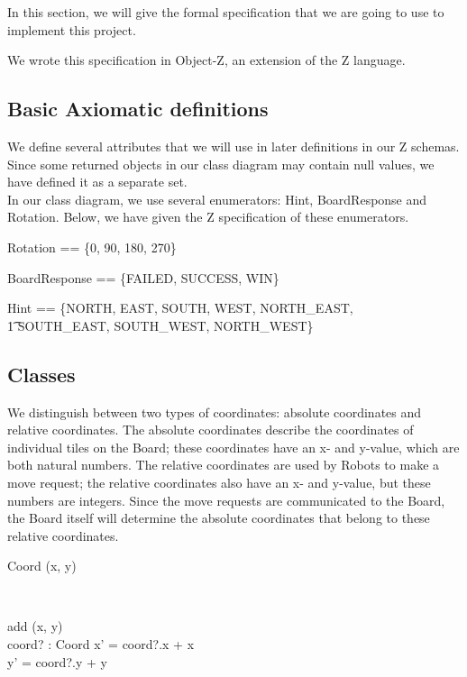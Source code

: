 In this section, we will give the formal specification that we are going to use to implement this project.

We wrote this specification in Object-Z, an extension of the Z language.

\subsection{Basic Axiomatic definitions}
We define several attributes that we will use in later definitions in our Z schemas. Since some returned objects in our class diagram may contain null values, we have defined it as a separate set. \\
In our class diagram, we use several enumerators: Hint, BoardResponse and Rotation. Below, we have given the Z specification of these enumerators.

\begin{axdef}
Rotation == \{0, 90, 180, 270\}
\end{axdef}

\begin{axdef}
BoardResponse == \{FAILED, SUCCESS, WIN\}
\end{axdef}

\begin{axdef}
Hint == \{NORTH, EAST, SOUTH, WEST, NORTH\_EAST, \\ \t1 SOUTH\_EAST, SOUTH\_WEST, NORTH\_WEST\}
\end{axdef}

\begin{zed}
[Null]
\end{zed}

\subsection{Classes}
We distinguish between two types of coordinates: absolute coordinates and relative coordinates. The absolute coordinates describe the coordinates of individual tiles on the Board; these coordinates have an x- and y-value, which are both natural numbers. The relative coordinates are used by Robots to make a move request; the relative coordinates also have an x- and y-value, but these numbers are integers. Since the move requests are communicated to the Board, the Board itself will determine the absolute coordinates that belong to these relative coordinates.

\begin{class}{Coord}
\upharpoonright (x, y) \\
 \\
\begin{schema}{add}
\Delta (x, y) \\
coord? : Coord
\where
x' = coord?.x + x \\
y' = coord?.y + y
\end{schema}
\end{class}

